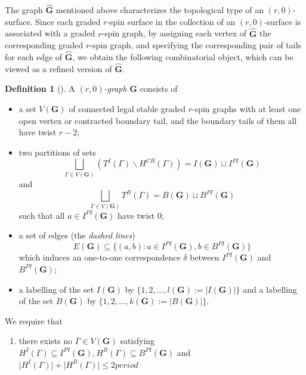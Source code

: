 \documentclass[11pt]{amsart}
\theoremstyle{definition}
\newtheorem{dfn}[dummy]{Definition}
\theoremstyle{remark}
\newcommand{\<}{\left<}
\renewcommand{\>}{\right>}
\numberwithin{equation}{section}
\begin{document}
The graph $\hat{\mathbf{G}}$ mentioned above characterizes the topological type of an $(r,0)$-surface. Since each graded $r$-spin surface in the collection of an $(r,0)$-surface is associated with a graded $r$-spin graph, by assigning each vertex of $\hat{\mathbf{G}}$ the corresponding graded $r$-spin graph, and specifying the corresponding pair of tails for each edge of $\hat{\mathbf{G}}$, we obtain the following combinatorial object, which can be viewed as a refined version of $\hat{\mathbf{G}}$.
\begin{dfn}[{\cite[Definition 4.7]{TZ1}}]\label{def rh graphs}
A \textit{$(r,0)$-graph}  $\mathbf{G}$ consists of 
\begin{itemize} 
    \item a set $V(\mathbf{G})$ of connected legal stable graded $r$-spin graphs with at least one open vertex or contracted boundary tail, and the boundary tails of them all have twist %
$r-2$;
    \item two %
partitions of sets
    $$
    \bigsqcup_{\Gamma\in V(\mathbf{G})}\left(T^I(\Gamma)\backslash H^{CB}(\Gamma)\right)=I(\mathbf{G})\sqcup I^{PI}(\mathbf{G})
    $$
    and
    $$
    \bigsqcup_{\Gamma\in V(\mathbf{G})}T^B(\Gamma)=B(\mathbf{G})\sqcup B^{PI}(\mathbf{G})
    $$
    such that all $a\in I^{PI}(\bm{G})$ have twist $0$;
    \item a set of edges (the \textit{dashed lines}) $$E(\mathbf{G})\subseteq \{(a,b)\colon a\in I^{PI}(\mathbf{G}),b\in B^{PI}(\mathbf{G})\}$$ which induces an one-to-one correspondence $\delta$ between $I^{PI}(\mathbf{G})$ and $B^{PI}(\mathbf{G})$;
    \item a labelling of the set $I(\mathbf{G})$ by $\{1,2,\dots,l(\mathbf{G}):=\lvert I(\mathbf{G})\rvert\}$ and a labelling of the set $B(\mathbf{G})$ by $\{1,2,\dots,k(\mathbf{G}):=\lvert B(\mathbf{G})\rvert\}$.
\end{itemize}
    We require that 
    \begin{enumerate}
        \item there exists no $\Gamma\in V(\mathbf{G})$ satisfying 
    $
    H^I(\Gamma)\subseteq I^{PI}(\mathbf{G}), H^B(\Gamma)\subseteq B^{PI}(\mathbf{G})$ 
and $
         \lvert H^I(\Gamma)\rvert+\lvert H^B(\Gamma)\rvert \le 2period
    $
    \end{enumerate}

\end{dfn}
\end{document}
